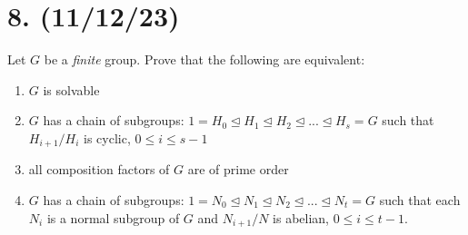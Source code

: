 \documentclass{article}
\begin{document}
\section*{8. (11/12/23)}

Let $G$ be a \emph{finite} group. Prove that the following are equivalent:
\begin{enumerate}[label=(\roman*), itemsep=0em]
    \item $G$ is solvable
    \item $G$ has a chain of subgroups: $1 = H_0 \unlhd H_1 \unlhd H_2 \unlhd ... \unlhd H_s = G$ such that $H_{i + 1}/H_i$ is cyclic, $0 \leq i \leq s - 1$
    \item all composition factors of $G$ are of prime order
    \item $G$ has a chain of subgroups: $1 = N_0 \unlhd N_1 \unlhd N_2 \unlhd ... \unlhd N_t = G$ such that each $N_i$ is a normal subgroup of $G$ and $N_{i + 1}/N$ is abelian, $0 \leq i \leq t - 1$.
\end{enumerate}
\end{document}
